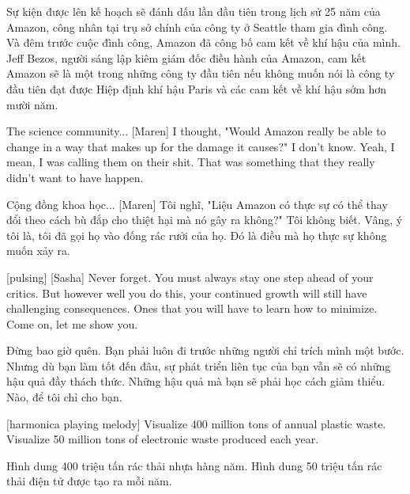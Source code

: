 \documentclass[a4paper]{article}
\begin{document}
	\begin{vietnamese-v2}
		 Sự kiện được lên kế hoạch sẽ đánh dấu lần đầu tiên trong lịch sử 25 năm của Amazon, công nhân tại trụ sở chính của công ty ở Seattle tham gia đình công.
		Và đêm trước cuộc đình công, Amazon đã công bố cam kết về khí hậu của mình.
		Jeff Bezos, người sáng lập kiêm giám đốc điều hành của Amazon, cam kết Amazon sẽ là một trong những công ty đầu tiên nếu không muốn nói là công ty đầu tiên đạt được Hiệp định khí hậu Paris và các cam kết về khí hậu sớm hơn mười năm.
	\end{vietnamese-v2}
	
	The science community...
	[Maren] I thought, "Would Amazon really be able to change in a way that makes up for the damage it causes?"
	I don't know.
	Yeah, I mean, I was calling them on their shit.
	That was something that they really didn't want to have happen.
	
	\begin{vietnamese-v2}
		Cộng đồng khoa học...
		[Maren] Tôi nghĩ, "Liệu Amazon có thực sự có thể thay đổi theo cách bù đắp cho thiệt hại mà nó gây ra không?"
		Tôi không biết.
		Vâng, ý tôi là, tôi đã gọi họ vào đống rác rưởi của họ.
		Đó là điều mà họ thực sự không muốn xảy ra.
	\end{vietnamese-v2}
	
	[pulsing]
	[Sasha] Never forget.
	You must always stay one step ahead of your critics.
	But however well you do this, your continued growth will still have challenging consequences.
	Ones that you will have to learn how to minimize.
	Come on, let me show you.
	
	\begin{vietnamese-v2}
		 Đừng bao giờ quên.
		Bạn phải luôn đi trước những người chỉ trích mình một bước.
		Nhưng dù bạn làm tốt đến đâu, sự phát triển liên tục của bạn vẫn sẽ có những hậu quả đầy thách thức.
		Những hậu quả mà bạn sẽ phải học cách giảm thiểu.
		Nào, để tôi chỉ cho bạn.
	\end{vietnamese-v2}
	
	[harmonica playing melody]
	Visualize 400 million tons of annual plastic waste.
	Visualize 50 million tons of electronic waste produced each year.
	
	\begin{vietnamese-v2}
		Hình dung 400 triệu tấn rác thải nhựa hàng năm.
		Hình dung 50 triệu tấn rác thải điện tử được tạo ra mỗi năm.
	\end{vietnamese-v2}
	
\end{document}
